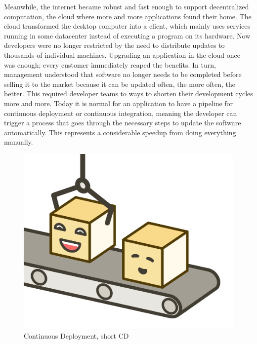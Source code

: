 Meanwhile, the internet became robust and fast enough to support decentralized computation, the cloud where more and more applications found their home. The cloud transformed the desktop computer into a client, which mainly uses services running in some datacenter instead of executing a program on its hardware. Now developers were no longer restricted by the need to distribute updates to thousands of individual machines. Upgrading an application in the cloud once was enough; every customer immediately reaped the benefits. In turn, management understood that software no longer needs to be completed before selling it to the market because it can be updated often, the more often, the better. This required developer teams to ways to shorten their development cycles more and more. Today it is normal for an application to have a pipeline for continuous deployment or continuous integration, meaning the developer can trigger a process that goes through the necessary steps to update the software automatically. This represents a considerable speedup from doing everything manually.

\begin{figure}[ht]
  \centering
  \includegraphics[width=0.4\linewidth]{assets/illustration-microservice-cd.png}
  \caption{Continuous Deployment, short CD}
\end{figure}

